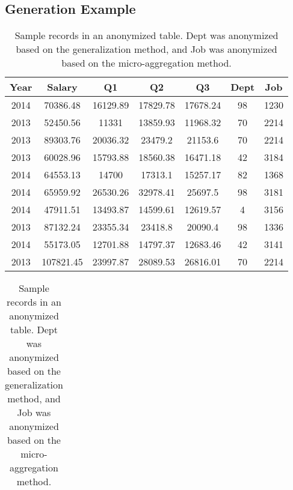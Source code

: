 \subsection*{Generation Example}
\begin{table}[t]
\small
\centering
\caption{Sample records in the original LACity table\label{T:org_data}}\vspace{-1em}
\begin{tabular}{|c|c|c|c|c|c|c|}
\hline
        Year  & Salary  & Q1 & Q2 & Q3 & Dept & Job \\ \hline
        2014 & 70386.48  & 16129.89 & 17829.78 & 17678.24 &  98 & 1230 \\
  2013 & 52450.56  & 11331    & 13859.93 & 11968.32 &  70 & 2214\\
  2013 & 89303.76  & 20036.32 & 23479.2  & 21153.6  &  70& 2214\\
  2013 & 60028.96  & 15793.88 & 18560.38 & 16471.18 &  42 & 3184 \\
  2014 & 64553.13  & 14700    & 17313.1  & 15257.17 & 82 & 1368 \\
  2014 & 65959.92  & 26530.26 & 32978.41 & 25697.5  &  98 & 3181\\
  2014 & 47911.51  & 13493.87 & 14599.61 & 12619.57 &  4 & 3156\\
  2013 & 87132.24  & 23355.34 & 23418.8  & 20090.4  &  98 & 1336\\
  2014 & 55173.05  & 12701.88 & 14797.37 & 12683.46 &  42 & 3141\\
  2013 & 107821.45 & 23997.87 & 28089.53 & 26816.01 &  70 & 2214\\
\hline
\end{tabular}
\vspace{1em}
\centering
\caption{Sample records in an anonymized table. Dept was anonymized based on the generalization method, and Job was anonymized based on the micro-aggregation method.\label{T:arx_data}}\vspace{-1em}
\begin{tabular}{|c|c|c|c|c|c|c|}
\hline


\end{tabular}
\end{table}
